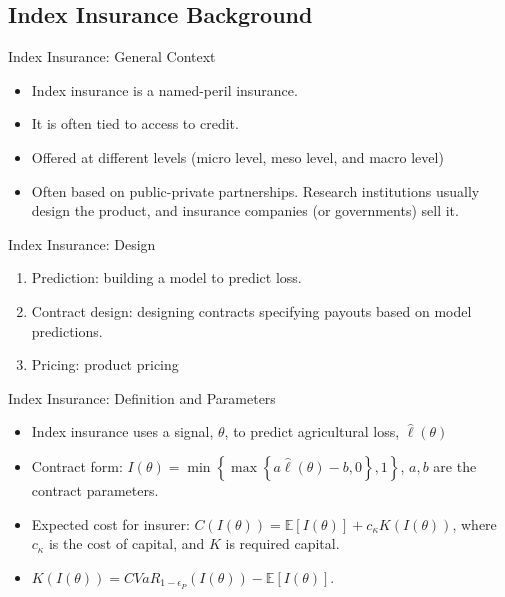 \documentclass{beamer}
\begin{document}
  
\subsection{Index Insurance Background}
\begin{frame}{Index Insurance: General Context}
\begin{itemize}
    \setlength\itemsep{1em}
    \item Index insurance is a named-peril insurance.
    \item It is often tied to access to credit.
    \item Offered at different levels (micro level, meso level, and macro level)
    \item Often based on public-private partnerships. Research institutions usually design the product, and insurance companies (or governments) sell it. 
\end{itemize}
\end{frame} 

\begin{frame}{Index Insurance: Design}
\begin{enumerate}
    \setlength\itemsep{2em}
    \item Prediction: building a model to predict loss. 
    \item Contract design: designing contracts specifying payouts based on model predictions.
    \item Pricing: product pricing
\end{enumerate}
\end{frame} 

\begin{frame}{Index Insurance: Definition and Parameters}
\begin{itemize}
    \setlength\itemsep{1em}
    \item Index insurance uses a signal, $\theta$, to predict agricultural loss, $\hat{\ell}(\theta)$
    \item Contract form: $I(\theta) = \min \left \{ \max \left \{a\hat{\ell}(\theta) - b,0 \right \}, 1 \right \}$, $a,b$ are the contract parameters.
    \item Expected cost for insurer: $C(I(\theta)) = \mathbb{E}[I(\theta)] + c_{\kappa} K(I(\theta))$, where $c_{\kappa}$ is the cost of capital, and $K$ is required capital.
    \item $K(I(\theta)) = CVaR_{1-\epsilon_P}\left ( I(\theta) \right ) - \mathbb{E}[I(\theta)]$.
\end{itemize}
\end{frame}
\end{document}
